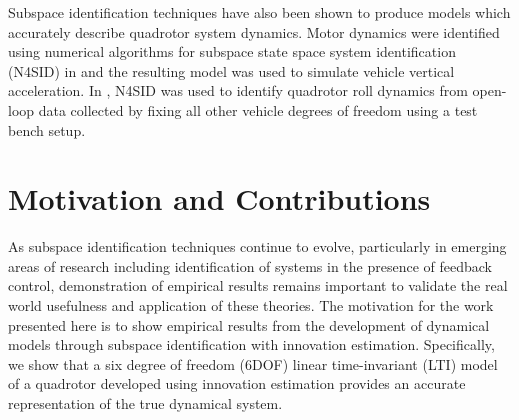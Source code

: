 Subspace identification techniques have also been shown to produce models which accurately describe quadrotor system dynamics. Motor dynamics were identified using numerical algorithms for subspace state space system identification (N4SID) in \cite{kis2011sensor} and the resulting model was used to simulate vehicle vertical acceleration. In \cite{batmazdesign}, N4SID was used to identify quadrotor roll dynamics from open-loop data collected by fixing all other vehicle degrees of freedom using a test bench setup. 


\section{Motivation and Contributions}
As subspace identification techniques continue to evolve, particularly in emerging areas of research including identification of systems in the presence of feedback control, demonstration of empirical results remains important to validate the real world usefulness and application of these theories. The motivation for the work presented here is to show empirical results from the development of dynamical models through subspace identification with innovation estimation. Specifically, we show that a six degree of freedom (6DOF) linear time-invariant (LTI) model of a quadrotor developed using innovation estimation provides an accurate representation of the true dynamical system.




